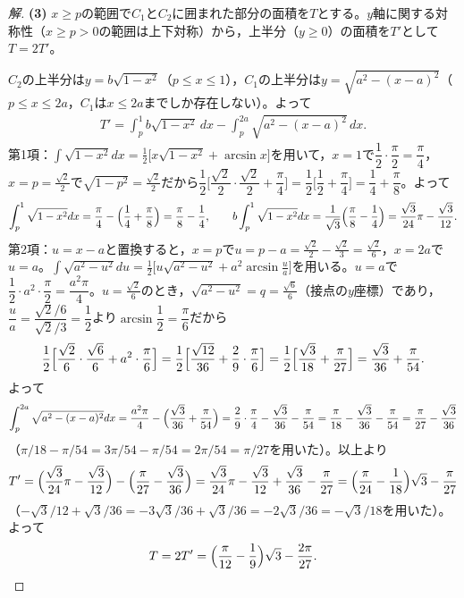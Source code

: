 \documentclass[../main.tex]{subfiles}
\begin{document}
\begin{proof}[解]
  \textbf{(3)} $x\ge p$の範囲で$C_1$と$C_2$に囲まれた部分の面積を$T$とする。$y$軸に関する対称性（$x\ge p>0$の範囲は上下対称）から，上半分（$y\ge0$）の面積を$T'$として$T=2T'$。

  $C_2$の上半分は$y=b\sqrt{1-x^2}$（$p\le x\le1$），$C_1$の上半分は$y=\sqrt{a^2-(x-a)^2}$（$p\le x\le2a$，$C_1$は$x\le2a$までしか存在しない）。よって
  \begin{align*}
    T'=\int_p^1b\sqrt{1-x^2}\,dx-\int_p^{2a}\sqrt{a^2-(x-a)^2}\,dx.
  \end{align*}
  第1項：$\displaystyle\int\sqrt{1-x^2}dx=\frac12\bigl[x\sqrt{1-x^2}+\arcsin x\bigr]$を用いて，$x=1$で$\dfrac12\cdot\dfrac\pi2=\dfrac\pi4$，$x=p=\frac{\sqrt2}2$で$\sqrt{1-p^2}=\frac{\sqrt2}2$だから$\dfrac12\bigl[\dfrac{\sqrt2}2\cdot\dfrac{\sqrt2}2+\dfrac\pi4\bigr]=\dfrac12\bigl[\dfrac12+\dfrac\pi4\bigr]=\dfrac14+\dfrac\pi8$。よって
  \begin{align*}
    \int_p^1\sqrt{1-x^2}dx=\frac\pi4-\Bigl(\frac14+\frac\pi8\Bigr)=\frac\pi8-\frac14,\qquad
    b\int_p^1\sqrt{1-x^2}dx=\frac1{\sqrt3}\Bigl(\frac\pi8-\frac14\Bigr)=\frac{\sqrt3}{24}\pi-\frac{\sqrt3}{12}.
  \end{align*}
  第2項：$u=x-a$と置換すると，$x=p$で$u=p-a=\frac{\sqrt2}2-\frac{\sqrt2}3=\frac{\sqrt2}6$，$x=2a$で$u=a$。$\displaystyle\int\sqrt{a^2-u^2}du=\frac12\bigl[u\sqrt{a^2-u^2}+a^2\arcsin\frac ua\bigr]$を用いる。$u=a$で$\dfrac12\cdot a^2\cdot\dfrac\pi2=\dfrac{a^2\pi}4$。$u=\frac{\sqrt2}6$のとき，$\sqrt{a^2-u^2}=q=\frac{\sqrt6}6$（接点の$y$座標）であり，$\dfrac ua=\dfrac{\sqrt2/6}{\sqrt2/3}=\dfrac12$より$\arcsin\dfrac12=\dfrac\pi6$だから
  \begin{align*}
    \frac12\Bigl[\frac{\sqrt2}6\cdot\frac{\sqrt6}6+a^2\cdot\frac\pi6\Bigr]=\frac12\Bigl[\frac{\sqrt{12}}{36}+\frac29\cdot\frac\pi6\Bigr]=\frac12\Bigl[\frac{\sqrt3}{18}+\frac\pi{27}\Bigr]=\frac{\sqrt3}{36}+\frac\pi{54}.
  \end{align*}
  よって
  \begin{align*}
    \int_p^{2a}\sqrt{a^2-(x-a)^2}dx=\frac{a^2\pi}4-\Bigl(\frac{\sqrt3}{36}+\frac\pi{54}\Bigr)=\frac29\cdot\frac\pi4-\frac{\sqrt3}{36}-\frac\pi{54}=\frac\pi{18}-\frac{\sqrt3}{36}-\frac\pi{54}=\frac\pi{27}-\frac{\sqrt3}{36}
  \end{align*}
  （$\pi/18-\pi/54=3\pi/54-\pi/54=2\pi/54=\pi/27$を用いた）。以上より
  \begin{align*}
    T'=\Bigl(\frac{\sqrt3}{24}\pi-\frac{\sqrt3}{12}\Bigr)-\Bigl(\frac\pi{27}-\frac{\sqrt3}{36}\Bigr)=\frac{\sqrt3}{24}\pi-\frac{\sqrt3}{12}+\frac{\sqrt3}{36}-\frac\pi{27}=\Bigl(\frac\pi{24}-\frac1{18}\Bigr)\sqrt3-\frac\pi{27}
  \end{align*}
  （$-\sqrt3/12+\sqrt3/36=-3\sqrt3/36+\sqrt3/36=-2\sqrt3/36=-\sqrt3/18$を用いた）。よって
  \begin{align*}
    T=2T'=\Bigl(\frac\pi{12}-\frac19\Bigr)\sqrt3-\frac{2\pi}{27}.
  \end{align*}
\end{proof}
\end{document}
